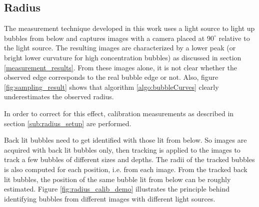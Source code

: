 			
			
			
			
		\subsection{Radius}\label{sub:radius_algorithm}
			The measurement technique developed in this work uses a light source to light up bubbles from below and captures images with a camera placed at $90^\circ$ relative to the light source. The resulting images are characterized by a lower peak (or bright lower curvature for high concentration bubbles) as discussed in section \ref{measurement_results}. From these images alone, it is not clear whether the observed edge corresponds to the real bubble edge or not. Also, figure \ref{fig:sampling_result} shows that algorithm \ref{algo:bubbleCurves} clearly underestimates the observed radius. 
			
			In order to correct for this effect, calibration measurements as described in section \ref{sub:radius_setup} are performed.
			
			Back lit bubbles need to get identified with those lit from below. So images are acquired with back lit bubbles only, then tracking is applied to the images to track a few bubbles of different sizes and depths. The radii of the tracked bubbles is also computed for each position, i.e. from each image. From the tracked back lit bubbles, the position of the same bubble lit from below can be roughly estimated. Figure \ref{fig:radius_calib_demo} illustrates the principle behind identifying bubbles from different images with different light sources. 
			

